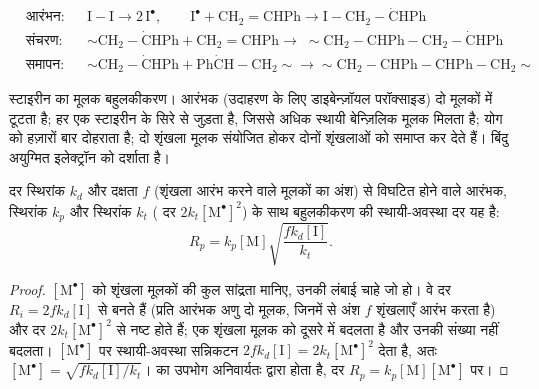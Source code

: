 \begin{omfigure}
\begin{align*}
&\text{आरंभन:} && \mathrm{I{-}I} \longrightarrow 2\,\mathrm{I^{\bullet}}, \qquad
\mathrm{I^{\bullet} + CH_2{=}CHPh \longrightarrow I{-}CH_2{-}\dot{C}HPh} \\
&\text{संचरण:} && {\sim}\mathrm{CH_2{-}\dot{C}HPh + CH_2{=}CHPh \longrightarrow}\;
{\sim}\mathrm{CH_2{-}CHPh{-}CH_2{-}\dot{C}HPh} \\
&\text{समापन:} && {\sim}\mathrm{CH_2{-}\dot{C}HPh + Ph\dot{C}H{-}CH_2}{\sim} \longrightarrow
{\sim}\mathrm{CH_2{-}CHPh{-}CHPh{-}CH_2}{\sim}
\end{align*}

{\small स्टाइरीन का मूलक बहुलकीकरण। आरंभक  (उदाहरण के लिए डाइबेन्ज़ॉयल परॉक्साइड)
दो मूलकों में टूटता है; हर एक स्टाइरीन के  सिरे से जुड़ता है, जिससे अधिक स्थायी बेन्ज़िलिक
मूलक मिलता है;  योग को हज़ारों बार दोहराता है; दो शृंखला मूलक संयोजित होकर दोनों
शृंखलाओं को समाप्त कर देते हैं। बिंदु अयुग्मित इलेक्ट्रॉन को दर्शाता है।}
\end{omfigure}

\begin{theorem}[मूलक बहुलकीकरण की दर]\label{thm:b2:polymer-synthesis:radical-rate}
दर स्थिरांक $k_d$ और दक्षता $f$ (शृंखला आरंभ करने वाले मूलकों का अंश) से विघटित होने वाले आरंभक,
 स्थिरांक $k_p$ और  स्थिरांक $k_t$ ( दर $2k_t
[\mathrm{M^\bullet}]^2$) के साथ बहुलकीकरण की स्थायी-अवस्था दर यह है:
\begin{equation*}
R_p = k_p [\mathrm M] \sqrt{\frac{f k_d [\mathrm I]}{k_t}}.
\end{equation*}
\end{theorem}

\begin{proof}
$[\mathrm{M^\bullet}]$ को शृंखला मूलकों की कुल सांद्रता मानिए, उनकी लंबाई चाहे जो हो। वे
दर $R_i = 2fk_d[\mathrm I]$ से बनते हैं (प्रति आरंभक अणु दो मूलक, जिनमें से अंश $f$
शृंखलाएँ आरंभ करता है) और दर $2k_t[\mathrm{M^\bullet}]^2$ से नष्ट होते हैं;  एक शृंखला
मूलक को दूसरे में बदलता है और उनकी संख्या नहीं बदलता। $[\mathrm{M^\bullet}]$ पर स्थायी-अवस्था सन्निकटन
$2fk_d[\mathrm I] = 2k_t[\mathrm{M^\bullet}]^2$ देता है, अतः $[\mathrm{M^\bullet}] =
\sqrt{fk_d[\mathrm I]/k_t}$।  का उपभोग अनिवार्यतः  द्वारा होता है, दर $R_p =
k_p[\mathrm M][\mathrm{M^\bullet}]$ पर।
\end{proof}

